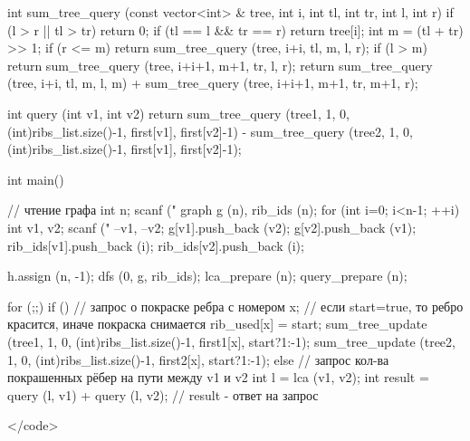 int sum_tree_query (const vector<int> & tree, int i, int tl, int tr, int l, int r)
{
	if (l > r || tl > tr)  return 0;
	if (tl == l && tr == r)
		return tree[i];
	int m = (tl + tr) >> 1;
	if (r <= m)
		return sum_tree_query (tree, i+i, tl, m, l, r);
	if (l > m)
		return sum_tree_query (tree, i+i+1, m+1, tr, l, r);
	return sum_tree_query (tree, i+i, tl, m, l, m)
		+ sum_tree_query (tree, i+i+1, m+1, tr, m+1, r);
}

int query (int v1, int v2)
{
	return sum_tree_query (tree1, 1, 0, (int)ribs_list.size()-1, first[v1], first[v2]-1)
		- sum_tree_query (tree2, 1, 0, (int)ribs_list.size()-1, first[v1], first[v2]-1);
}


int main()
{
	// чтение графа
	int n;
	scanf ("%
	graph g (n), rib_ids (n);
	for (int i=0; i<n-1; ++i)
	{
		int v1, v2;
		scanf ("%
		--v1, --v2;
		g[v1].push_back (v2);
		g[v2].push_back (v1);
		rib_ids[v1].push_back (i);
		rib_ids[v2].push_back (i);
	}

	h.assign (n, -1);
	dfs (0, g, rib_ids);
	lca_prepare (n);
	query_prepare (n);

	for (;;) {
		if () {
			// запрос о покраске ребра с номером x;
			//    если start=true, то ребро красится, иначе покраска снимается
			rib_used[x] = start;
			sum_tree_update (tree1, 1, 0, (int)ribs_list.size()-1, first1[x], start?1:-1);
			sum_tree_update (tree2, 1, 0, (int)ribs_list.size()-1, first2[x], start?1:-1);
		}
		else {
			// запрос кол-ва покрашенных рёбер на пути между v1 и v2
			int l = lca (v1, v2);
			int result = query (l, v1) + query (l, v2);
			// result - ответ на запрос
		}
	}

}</code>